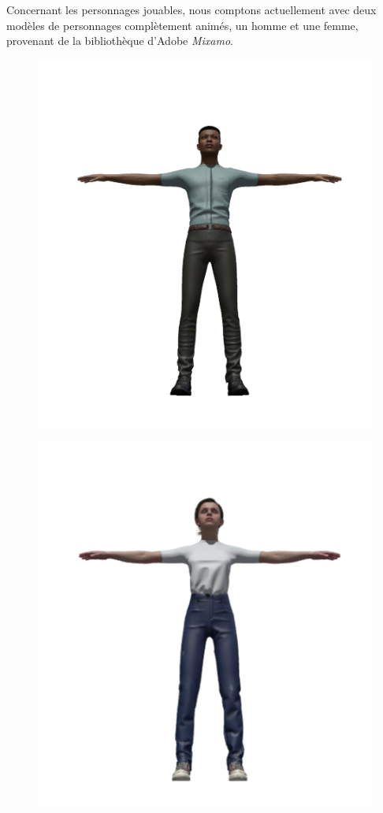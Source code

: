 Concernant les personnages jouables, nous comptons actuellement avec deux modèles de personnages complètement animés, un homme et une femme, provenant de la bibliothèque d’Adobe \emph{Mixamo}.
\newline

\begin{figure}[H]
\centering
\begin{minipage}{.5\textwidth}
  \centering
  \includegraphics[width=.6\linewidth]{img/assets/remi.png}
  \label{fig:rémi}
\end{minipage}%
\begin{minipage}{.5\textwidth}
  \centering
  \includegraphics[width=.6\linewidth]{img/assets/sonia.png}
  \label{fig:sonia}
\end{minipage}
\end{figure}

